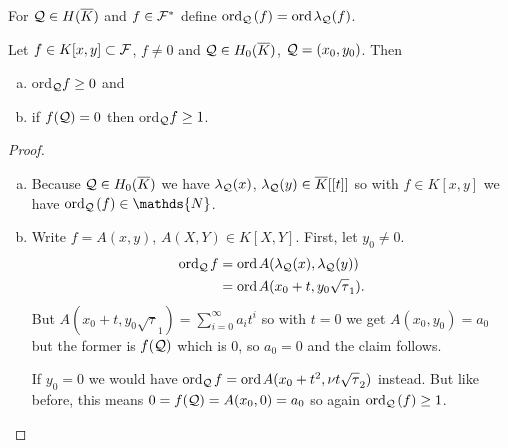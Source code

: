 \documentclass[english,11pt,a4paper]{article}
\begin{document}
\vspace{-3mm}
\fline
\vspace{-3mm}
\begin{defin}
   For $\mathcal{Q} \in H(\overline K)$ and $f \in \mathcal{F}^*$ define $\text{ord}_{\mathcal{Q}}\hspace{0.4mm} (f) = \text{ord\hspace{0.4mm}} \lambda_{\mathcal{Q}} (f)$.
\end{defin}
\vspace{-5.5mm}
\fline


\begin{lemma}\label{one}
  Let $f \in K[x,y] \subset \mathcal{F}$, $f \neq 0$ and $\mathcal{Q} \in H_0(\overline K)$, $\mathcal{Q} = (x_0,y_0)$. Then
  \begin{enumerate}[(a)]\parskip 1mm
    \item ord$_{\mathcal{Q}} f \geq 0$ and
    \item if $f(\mathcal{Q}) = 0$ then ord$_{\mathcal{Q}} f \geq 1$.
  \end{enumerate}\parskip 3mm
  \begin{proof}\hfill
    \begin{enumerate}[(a)]\parskip 1mm
      \item Because $\mathcal{Q} \in H_0(\overline K)$ we have $\lambda_{\mathcal{Q}}(x)$, $\lambda_{\mathcal{Q}}(y) \in \overline K[[t]]$ so with $f \in K[x,y]$ we have $\ordq (f) \in \mathds{N}$.
      \item Write $f = A(x,y)$, $A(X,Y) \in K[X,Y]$. First, let $y_0 \neq 0$.
      \begin{align*}
        \text{ord}_{\mathcal{Q}}\hspace{0.4mm} f &= \text{ord\hspace{0.4mm}} A(\lambda_{\mathcal{Q}}(x), \lambda_{\mathcal{Q}}(y))\\
        &= \text{ord\hspace{0.4mm}} A(x_0 + t, y_0 \sqrt \tau_1).
      \end{align*}
      But $A(x_0 + t, y_0 \sqrt \tau_1)=\sum_{i=0}^{\infty} a_i t^i$ so with $t=0$ we get $A(x_0, y_0)=a_0$ but the former is $f(\mathcal{Q})$ which is $0$, so $a_0 = 0$ and the claim follows.

      If $y_0 = 0$ we would have $\text{ord}_{\mathcal{Q}}\hspace{0.4mm} f = \text{ord\hspace{0.4mm}} A(x_0 + t^2, \nu t \sqrt \tau_2)$ instead. But like before, this means $0 = f(\mathcal{Q}) = A(x_0, 0) = a_0$ so again $\text{ord}_{\mathcal{Q}}\hspace{0.4mm} (f) \geq 1$.
    \end{enumerate}\parskip 3mm
  \end{proof}
\end{lemma}
\end{document}
